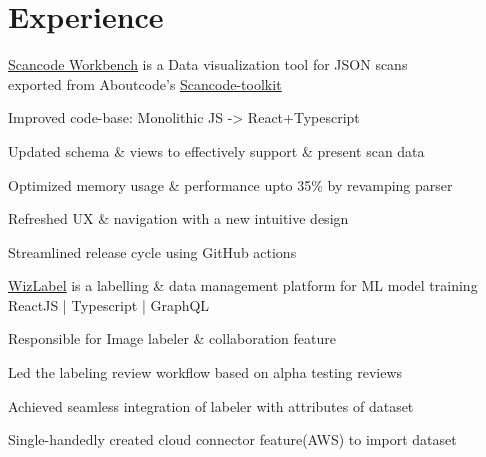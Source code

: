 \documentclass[]{deedy-resume-openfont}
\begin{document}
\begin{minipage}[t]{0.605\textwidth} 


\section{Experience}


\href{https://github.com/nexB/scancode-workbench}{\underline{Scancode Workbench}}
is a Data visualization tool for JSON scans \\
exported from Aboutcode's \underline{\href{https://github.com/nexB/scancode-toolkit}{Scancode-toolkit}}
\vspace{\topsep} %
\begin{tightemize}
\item Improved code-base: Monolithic JS -> React+Typescript
\item Updated schema {\&} views to effectively support {\&} present scan data
\item Optimized memory usage {\&} performance upto 35{\%} by revamping parser
\item Refreshed UX {\&} navigation with a new intuitive design
\item Streamlined release cycle using GitHub actions
\end{tightemize}
\sectionsep

\underline{\href{https://litwizlabs.ai/wizlabel}{WizLabel}}
is a labelling {\&} data management platform for ML model training \\
{ReactJS | Typescript | GraphQL}
\begin{tightemize}
\item Responsible for Image labeler {\&} collaboration feature 
\item Led the labeling review workflow based on alpha testing reviews
\item Achieved seamless integration of labeler with attributes of dataset
\item Single-handedly created cloud connector feature(AWS) to import dataset
\end{tightemize}
\sectionsep


\end{minipage}
\end{document}
